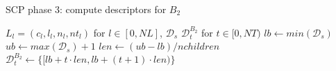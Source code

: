 \begin{algorithm}
  \caption{SCP phase 3: compute descriptors for $B_2$}
  \label{alg:scp.phase3}
  \begin{algorithmic}[1]
    \REQUIRE $L_l = (c_l,l_l,n_l,nt_l)$ for $l \in [0, NL]$, $\mathcal{D}_s$
    \ENSURE $\mathcal{D}_t^{B_2}$ for $t \in [0, NT)$
    \STATE $lb \gets min(\mathcal{D}_s)$ \label{line:lb}
    \STATE $ub \gets max(\mathcal{D}_s)+1$ \label{line:ub}
    \STATE $len \gets (ub - lb) / nchildren$ \label{line:len}
     \label{line:thread.for}
    \STATE $\mathcal{D}_t^{B_2} \gets \lbrace [lb + t \cdot len, lb + (t+1) \cdot len) \rbrace$
    \ENDFOR \label{line:thread.forend}
  \end{algorithmic}
\end{algorithm}


